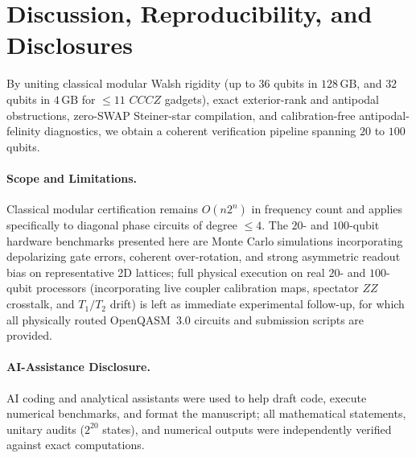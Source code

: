 \documentclass[11pt,a4paper]{article}
\begin{document}
\section{Discussion, Reproducibility, and Disclosures}
By uniting classical modular Walsh rigidity (up to $36$ qubits in $128\,\text{GB}$, and $32$ qubits in $4\,\text{GB}$ for $\le 11$ $CCCZ$ gadgets), exact exterior-rank and antipodal obstructions, zero-SWAP Steiner-star compilation, and calibration-free antipodal-felinity diagnostics, we obtain a coherent verification pipeline spanning $20$ to $100$ qubits.

\paragraph{Scope and Limitations.}
Classical modular certification remains $O(n2^n)$ in frequency count and applies specifically to diagonal phase circuits of degree $\le 4$. The $20$- and $100$-qubit hardware benchmarks presented here are Monte Carlo simulations incorporating depolarizing gate errors, coherent over-rotation, and strong asymmetric readout bias on representative 2D lattices; full physical execution on real $20$- and $100$-qubit processors (incorporating live coupler calibration maps, spectator $ZZ$ crosstalk, and $T_1/T_2$ drift) is left as immediate experimental follow-up, for which all physically routed OpenQASM~3.0 circuits and submission scripts are provided.

\paragraph{AI-Assistance Disclosure.}
AI coding and analytical assistants were used to help draft code, execute numerical benchmarks, and format the manuscript; all mathematical statements, unitary audits ($2^{20}$ states), and numerical outputs were independently verified against exact computations.
\end{document}
